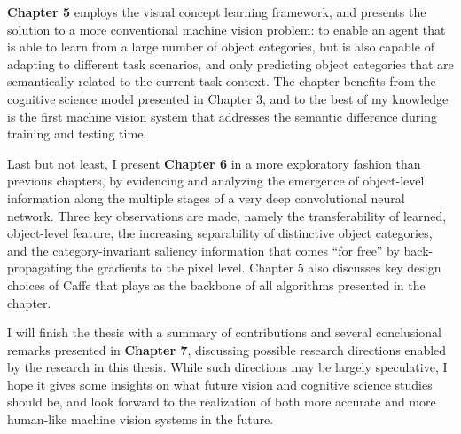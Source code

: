 {\bfseries Chapter 5} employs the visual concept learning framework, and presents the solution to a more conventional machine vision problem: to enable an agent that is able to learn from a large number of object categories, but is also capable of adapting to different task scenarios, and only predicting object categories that are semantically related to the current task context. The chapter benefits from the cognitive science model presented in Chapter 3, and to the best of my knowledge is the first machine vision system that addresses the semantic difference during training and testing time.

Last but not least, I present {\bfseries Chapter 6} in a more exploratory fashion than previous chapters, by evidencing and analyzing the emergence of object-level information along the multiple stages of a very deep convolutional neural network. Three key observations are made, namely the transferability of learned, object-level feature, the increasing  separability of distinctive object categories, and the category-invariant saliency information that comes ``for free'' by back-propagating the gradients to the pixel level. Chapter 5 also discusses key design choices of Caffe that plays as the backbone of all algorithms presented in the chapter.

I will finish the thesis with a summary of contributions and several conclusional remarks presented in {\bfseries Chapter 7}, discussing possible research directions enabled by the research in this thesis. While such directions may be largely speculative, I hope it gives some insights on what future vision and cognitive science studies should be, and look forward to the realization of both more accurate and more human-like machine vision systems in the future.

